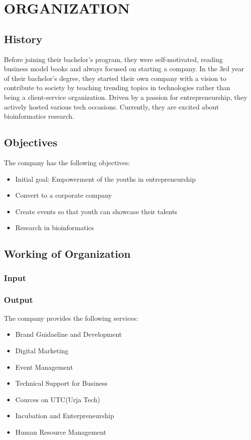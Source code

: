 
\chapter{ORGANIZATION}
      \section{History}
      Before joining their bachelor's program, they were self-motivated, reading business model books and always focused on starting a company. In the 3rd year of their bachelor's degree, they started their own company with a vision to contribute to society by teaching trending topics in technologies rather than being a client-service organization. Driven by a passion for entrepreneurship, they actively hosted various tech occasions. Currently, they are excited about bioinformatics research.
      
      \section{Objectives}
      The company has the following objectives:
      \begin{itemize}
        \item Initial goal: Empowerment of the youths in entrepreneurship
        \item Convert to a corporate company
        \item Create events so that youth can showcase their talents
        \item Research in bioinformatics
      \end{itemize}

      \section{Working of Organization}
      \subsection{Input}

      \subsection{Output}
      The company provides the following services:
      \begin{itemize}
        \item Brand Guidaeline and Development
        \item Digital Marketing
        \item Event Management
        \item Technical Support for Business
        \item Cources on UTC(Urja Tech)
        \item Incubation and Enterpreneurship
        \item Human Resource Management
      \end{itemize}

